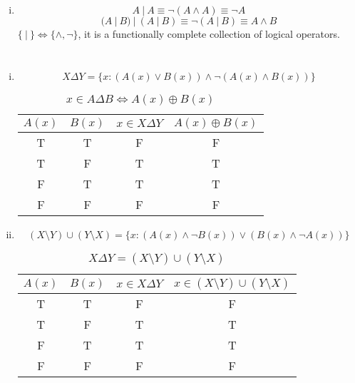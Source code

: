 \documentclass{article}
\begin{document}
\begin{enumerate}[i)]
\item
$$A\ |\ A\equiv \lnot(A\land A)\equiv \lnot A$$
$$(A\ |\ B)\ |\ (A\ |\ B)\equiv\lnot(A\ |\ B)\equiv A\land B$$
$\{\ |\ \}\Leftrightarrow\{\land,\lnot\}$, it is a functionally complete collection of logical operators. 

\end{enumerate}

\newpage

\section{}
\begin{enumerate}[i)]
\item
$$X\Delta Y=\{x:(A(x)\lor B(x))\land\lnot(A(x)\land B(x))\}$$
\begin{table}[!h]
\begin{center}
\begin{tabular}{cccc}
\hline
$A(x)$ & $B(x)$ & $x\in X\Delta Y$ & $A(x)\oplus B(x)$\\
\hline
T & T & F & F\\
T & F & T & T\\
F & T & T & T\\
F & F & F & F\\
\hline
\end{tabular}
\end{center}
\caption*{$x\in A\Delta B\Leftrightarrow A(x)\oplus B(x)$}
\end{table}

\item
$$(X\setminus Y)\cup(Y\setminus X)=\{x:(A(x)\land\lnot B(x))\lor(B(x)\land\lnot A(x))\}$$
\begin{table}[!h]
\begin{center}
\begin{tabular}{cccc}
\hline
$A(x)$ & $B(x)$ & $x\in X\Delta Y$ & $x\in(X\setminus Y)\cup(Y\setminus X)$\\
\hline
T & T & F & F\\
T & F & T & T\\
F & T & T & T\\
F & F & F & F\\
\hline
\end{tabular}
\end{center}
\caption*{$X\Delta Y=(X\setminus Y)\cup(Y\setminus X)$}
\end{table}


\end{enumerate}
\end{document}
